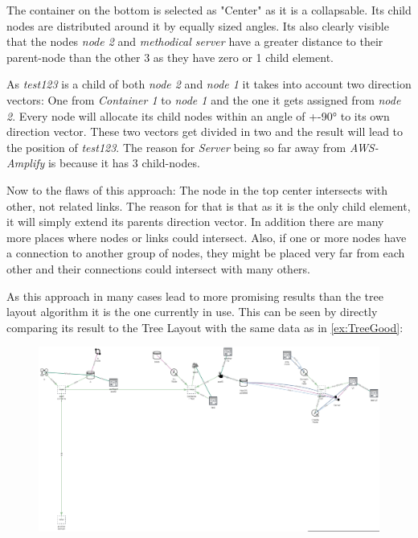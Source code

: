 The container on the bottom is selected as "Center" as it is a collapsable. Its child nodes are distributed around it by equally sized angles. Its also clearly visible that the nodes \emph{node 2} and \emph{methodical server} have a greater distance to their parent-node than the other 3 as they have zero or 1 child element.

As \emph{test123} is a child of both \emph{node 2} and \emph{node 1} it takes into account two direction vectors: One from \emph{Container 1} to \emph{node 1} and the one it gets assigned from \emph{node 2}. Every node will allocate its child nodes within an angle of +-90° to its own direction vector. These two vectors get divided in two and the result will lead to the position of \emph{test123}. The reason for \emph{Server} being so far away from \emph{AWS-Amplify} is because it has 3 child-nodes.

Now to the flaws of this approach: The node in the top center intersects with other, not related links. The reason for that is that as it is the only child element, it will simply extend its parents direction vector.
In addition there are many more places where nodes or links could intersect. Also, if one or more nodes have a connection to another group of nodes, they might be placed very far from each other and their connections could intersect with many others.

As this approach in many cases lead to more promising results than the tree layout algorithm it is the one currently in use. This can be seen by directly comparing its result to the Tree Layout with the same data as in \autoref{ex:TreeGood}:

\begin{figure}[H]
\centering
\includegraphics[scale=.4]{Bilder/FlowerCompTree.png}
\label{ex:ComparisonTreeFlower}
\end{figure}

